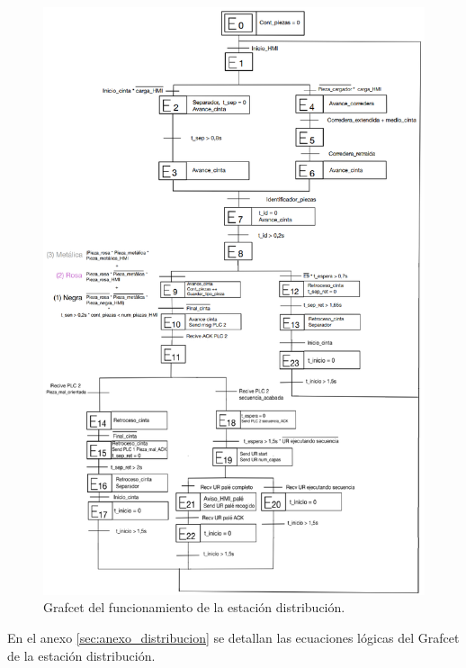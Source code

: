 \begin{figure} [h!]
  \begin{center}
    \includegraphics[width=14cm]{figs/grafcet_distribucion}
  \end{center}
  \caption{\centering Grafcet del funcionamiento de la estación distribución.}
  \label{fig:grafcet_distribucion}
\end{figure} 

En el anexo \ref{sec:anexo_distribucion} se detallan las ecuaciones lógicas del Grafcet de la estación distribución.

\clearpage


